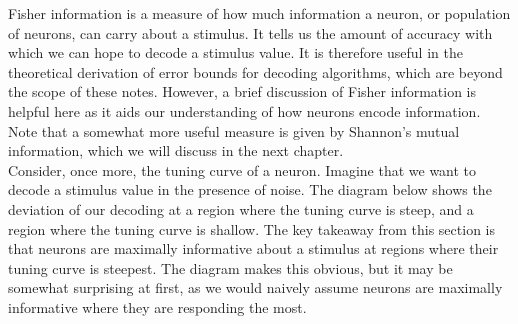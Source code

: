 \documentclass{article}
\begin{document}
Fisher information is a measure of how much information a neuron, or population of neurons, can carry about a stimulus. It tells us the amount of accuracy with which we can hope to decode a stimulus value. It is therefore useful in the theoretical derivation of error bounds for decoding algorithms, which are beyond the scope of these notes. However, a brief discussion of Fisher information is helpful here as it aids our understanding of how neurons encode information. Note that a somewhat more useful measure is given by Shannon's mutual information, which we will discuss in the next chapter.\\

Consider, once more, the tuning curve of a neuron. Imagine that we want to decode a stimulus value in the presence of noise. The diagram below shows the deviation of our decoding at a region where the tuning curve is steep, and a region where the tuning curve is shallow. The key takeaway from this section is that neurons are maximally informative about a stimulus at regions where their tuning curve is steepest. The diagram makes this obvious, but it may be somewhat surprising at first, as we would naively assume neurons are maximally informative where they are responding the most.
\end{document}
